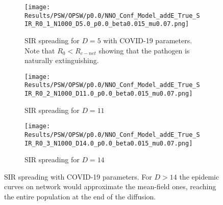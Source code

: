 \documentclass[a4paper,10pt,twoside]{book} %
\theoremstyle{definition}
\begin{document}
\begin{figure}[p]
	\centering
    \begin{subfigure}[t]{\linewidth}
        \texttt{[image: Results/PSW/OPSW/p0.0/NNO\_Conf\_Model\_addE\_True\_SIR\_R0\_1\_N1000\_D5.0\_p0.0\_beta0.015\_mu0.07.png]}
		\centering
        \caption{SIR spreading for $D = 5$ with COVID-19 parameters. Note that $R_0 < R_{c-net}$ showing that the pathogen is naturally extinguishing.}
        \label{fig:sir_O-PSW_D5_p0}
    \end{subfigure}
	\vfill
	\begin{subfigure}[b]{\linewidth}
		\centering
        \texttt{[image: Results/PSW/OPSW/p0.0/NNO\_Conf\_Model\_addE\_True\_SIR\_R0\_2\_N1000\_D11.0\_p0.0\_beta0.015\_mu0.07.png]}
        \caption{SIR spreading for $D = 11$}
        \label{fig:sir_O-PSW_D11_p0}
    \end{subfigure}
	\vfill
	\begin{subfigure}[b]{\linewidth}
		\centering
        \texttt{[image: Results/PSW/OPSW/p0.0/NNO\_Conf\_Model\_addE\_True\_SIR\_R0\_3\_N1000\_D14.0\_p0.0\_beta0.015\_mu0.07.png]}
        \caption{SIR spreading for $D = 14$}
        \label{fig:sir_O-PSW_D14_p0}
    \end{subfigure}
	\caption{SIR spreading with COVID-19 parameters. For $D > 14$ the epidemic curves on network would approximate the mean-field ones, reaching the entire population at the end of the diffusion.}
	\label{fig:sir_O-PSW_COVID}
\end{figure}
\end{document}

